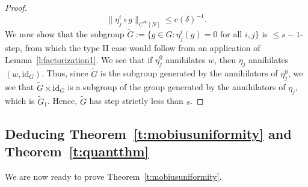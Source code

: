 \documentclass[11pt, a4paper]{amsart}
\theoremstyle{plain}
\theoremstyle{plain}
\theoremstyle{definition}
\theoremstyle{remark}
\numberwithin{equation}{section}
\numberwithin{lemma}{section}
\numberwithin{proposition}{section}
\numberwithin{corollary}{section}
\numberwithin{definition}{section}
\numberwithin{claim}{section}
\begin{document}
\begin{proof}
$$\|\eta_j^i \circ g\|_{C^\infty[N]} \le c(\delta)^{-1}.$$
We now show that the subgroup $\tilde{G} := \{g \in G: \eta_j^i(g) = 0 \text{ for all } i, j\}$ is $\le s - 1$-step, from which the type II case would follow from an application of Lemma~\ref{l:factorization1}. We see that if $\eta_j^0$ annihilates $w$, then $\eta_j$ annihilates $(w, \mathrm{id}_G)$. Thus, since $\tilde{G}$ is the subgroup generated by the annihilators of $\eta_j^0$, we see that $\tilde{G} \times \mathrm{id}_G$ is a subgroup of the group generated by the annihilators of $\eta_j$, which is $\tilde{G}_1$. Hence, $\tilde{G}$ has step strictly less than $s$.
\end{proof}

\subsection{Deducing Theorem~\ref{t:mobiusuniformity} and Theorem~\ref{t:quantthm}}\label{s:theoremmobius}
We are now ready to prove Theorem~\ref{t:mobiusuniformity}.
\end{document}
